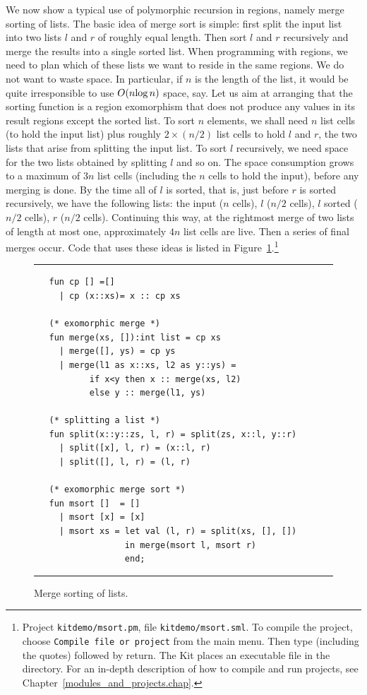 \documentclass[12pt]{book}
\begin{document}
We now show a typical use of polymorphic recursion in regions, namely
merge sorting of lists. The basic idea of merge sort is simple: first
split the input list into two lists $l$ and $r$ of roughly equal
length.  Then sort $l$ and $r$ recursively and merge the results into
a single sorted list.  When programming with regions, we need to plan
which of these lists we want to reside in the same regions. We do not
want to waste space. In particular, if $n$ is the length of the list,
it would be quite irresponsible to use $O(n\hbox{log}\,n)$ space, say.
Let us aim at arranging that the sorting function is a region
exomorphism that does not produce any values in its result regions
except the sorted list. To sort $n$ elements, we shall need $n$ list
cells (to hold the input list) plus roughly $2\times(n/2)$ list cells
to hold $l$ and $r$, the two lists that arise from splitting the input
list. To sort $l$ recursively, we need space for the two lists
obtained by splitting $l$ and so on. The space consumption grows to a
maximum of $3n$ list cells (including the $n$ cells to hold the
input), before any merging is done.  By the time all of $l$ is sorted,
that is, just before $r$ is sorted recursively, we have the following
lists: the input ($n$ cells), $l$ ($n/2$ cells), $l$ sorted ($n/2$
cells), $r$ ($n/2$ cells). Continuing this way, at the rightmost merge
of two lists of length at most one, approximately $4n$ list cells are
live.  Then a series of final merges occur.  Code that uses these
ideas is listed in 
%
%
%
%
%
Figure~\ref{msort.fig}.\footnote{Project
  {\tt kitdemo/msort.pm}, file {\tt kitdemo/msort.sml}. To compile the
  project, choose {\tt Compile file or project} from the main menu.
  Then type  (including the quotes) followed by
  return. The Kit
  places an executable file  in the 
  directory. For an in-depth description of how to compile and run
  projects, see Chapter~\ref{modules_and_projects.chap}.}
\begin{figure}[t]
\hrule
\medskip
\begin{verbatim}
   fun cp [] =[]
     | cp (x::xs)= x :: cp xs

   (* exomorphic merge *)
   fun merge(xs, []):int list = cp xs
     | merge([], ys) = cp ys
     | merge(l1 as x::xs, l2 as y::ys) = 
           if x<y then x :: merge(xs, l2) 
           else y :: merge(l1, ys)

   (* splitting a list *)
   fun split(x::y::zs, l, r) = split(zs, x::l, y::r)
     | split([x], l, r) = (x::l, r)
     | split([], l, r) = (l, r)

   (* exomorphic merge sort *)
   fun msort []  = []
     | msort [x] = [x]
     | msort xs = let val (l, r) = split(xs, [], [])
                  in merge(msort l, msort r)
                  end;
\end{verbatim}
\caption{Merge sorting of lists.}
\label{msort.fig}
\medskip\hrule
\end{figure}
\end{document}
